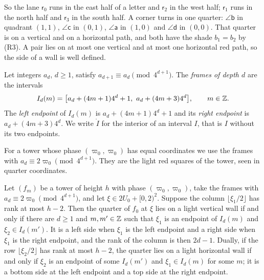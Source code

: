 So the lane $\mathsf r_0$ runs in the east half of a letter and $\mathsf r_2$ in the west half; $\mathsf r_1$ runs in the north half and $\mathsf r_3$ in the south half. A corner turns in one quarter: $\angle\mathsf b$ in quadrant $(1,1)$, $\angle\mathsf c$ in $(0,1)$, $\angle\mathsf a$ in $(1,0)$ and $\angle\mathsf d$ in $(0,0)$. That quarter is on a vertical and on a horizontal path, and both have the shade $b_1=b_2$ by (R3). A pair lies on at most one vertical and at most one horizontal red path, so the side of a wall is well defined.

\begin{definition}[Frames]\label{fam:def-frames}
Let integers $a_d$, $d\ge1$, satisfy $a_{d+1}\equiv a_d\pmod{4^{d+1}}$. The \emph{frames of depth $d$} are the intervals
\[
I_d(m)=\bigl[a_d+(4m+1)4^d+1,\ a_d+(4m+3)4^d\bigr],\qquad m\in\Z .
\]
The \emph{left endpoint} of $I_d(m)$ is $a_d+(4m+1)4^d+1$ and its \emph{right endpoint} is $a_d+(4m+3)4^d$. We write $\mathring I$ for the interior of an interval $I$, that is $I$ without its two endpoints.
\end{definition}

For a tower whose phase $(\varpi_0,\varpi_0)$ has equal coordinates we use the frames with $a_d\equiv2\varpi_0\pmod{4^{d+1}}$. They are the light red squares of the tower, seen in quarter coordinates.

\begin{lemma}\label{fam:walls}
Let $(f_m)$ be a tower of height $h$ with phase $(\varpi_0,\varpi_0)$, take the frames with $a_d\equiv2\varpi_0\pmod{4^{d+1}}$, and let $\xi\in2U_0+[0,2)^2$. Suppose the column $\lfloor\xi_1/2\rfloor$ has rank at most $h-2$. Then the quarter of $f_0$ at $\xi$ lies on a light vertical wall if and only if there are $d\ge1$ and $m,m'\in\mathbb{Z}$ such that $\xi_1$ is an endpoint of $I_d(m)$ and $\xi_2\in I_d(m')$. It is a left side when $\xi_1$ is the left endpoint and a right side when $\xi_1$ is the right endpoint, and the rank of the column is then $2d-1$. Dually, if the row $\lfloor\xi_2/2\rfloor$ has rank at most $h-2$, the quarter lies on a light horizontal wall if and only if $\xi_2$ is an endpoint of some $I_d(m')$ and $\xi_1\in I_d(m)$ for some $m$; it is a bottom side at the left endpoint and a top side at the right endpoint.
\end{lemma}

